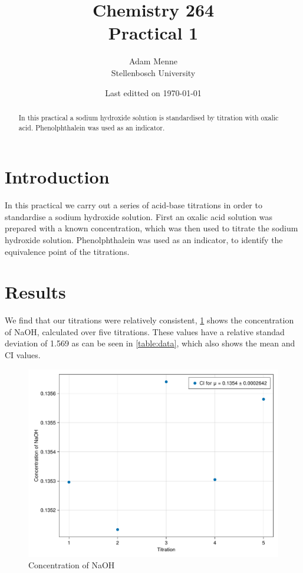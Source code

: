 \documentclass[a4paper, british]{article}
\title{Chemistry 264\\ Practical 1}
\date{Last editted on \today}
\author{Adam Menne\\ Stellenbosch University}
\begin{document}
\maketitle

\begin{abstract}
\noindent
In this practical a sodium hydroxide solution is standardised by titration with oxalic acid. Phenolphthalein was used as an indicator.
\end{abstract}

\tableofcontents

\newpage

\section{Introduction}

In this practical we carry out a series of acid-base titrations in order to standardise a sodium hydroxide solution. First an oxalic acid solution was prepared with a known concentration, which was then used to titrate the sodium hydroxide solution. Phenolphthalein was used as an indicator, to identify the equivalence point of the titrations. 


\section{Results}

We find that our titrations were relatively consistent, \cref{fig:mean} shows the concentration of NaOH, calculated over five titrations. These values have a relative standad deviation of 1.569 as can be seen in \cref{table:data}, which also shows the mean and CI values.

\begin{figure}[h]
    \centering
    \includegraphics[width=\textwidth]{figures/conc.pdf}
    \caption{Concentration of NaOH}
    \label{fig:mean}
\end{figure}
\end{document}
